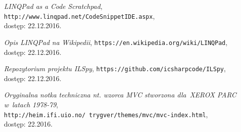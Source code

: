 \documentclass[a4paper,twoside,titlepage,openright]{book}
\begin{document}
\begin{thebibliography}{99}
 \textit{LINQPad as a Code Scratchpad}, 
\texttt{http://www.linqpad.net/CodeSnippetIDE.aspx}, \\dostęp: 22.12.2016.

 \textit{Opis LINQPad na Wikipedii}, 
\texttt{https://en.wikipedia.org/wiki/LINQPad}, \\dostęp: 22.12.2016.

 \textit{Repozytorium projektu ILSpy}, 
\texttt{https://github.com/icsharpcode/ILSpy}, \\dostęp: 22.12.2016.

 \textit{Oryginalna notka techniczna nt. wzorca MVC stworzona dla~XEROX PARC w~latach 1978-79}, \\
\texttt{http://heim.ifi.uio.no/~trygver/themes/mvc/mvc-index.html}, \\dostęp: 22.2016.



\end{thebibliography}
\end{document}
